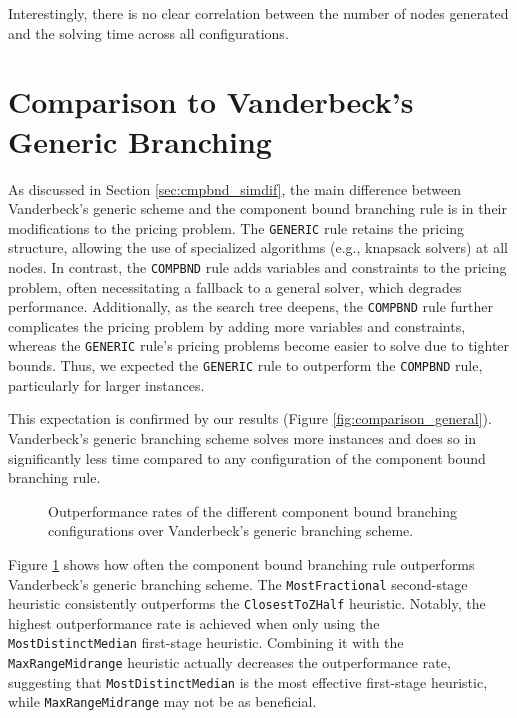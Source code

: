 Interestingly, there is no clear correlation between the number of nodes generated and the solving time across all configurations.

\section{Comparison to Vanderbeck's Generic Branching}\label{sec:evaluation_comparison_generic}
As discussed in Section \ref{sec:cmpbnd_simdif}, the main difference between Vanderbeck's generic scheme and the component bound branching rule is in their modifications to the pricing problem. The \texttt{GENERIC} rule retains the pricing structure, allowing the use of specialized algorithms (e.g., knapsack solvers) at all nodes. In contrast, the \texttt{COMPBND} rule adds variables and constraints to the pricing problem, often necessitating a fallback to a general \MIP{} solver, which degrades performance. Additionally, as the search tree deepens, the \texttt{COMPBND} rule further complicates the pricing problem by adding more variables and constraints, whereas the \texttt{GENERIC} rule’s pricing problems become easier to solve due to tighter bounds. Thus, we expected the \texttt{GENERIC} rule to outperform the \texttt{COMPBND} rule, particularly for larger instances.

This expectation is confirmed by our results (Figure \ref{fig:comparison_general}). Vanderbeck's generic branching scheme solves more instances and does so in significantly less time compared to any configuration of the component bound branching rule.

\begin{figure}
	\centering

	\begin{subfigure}{0.495\textwidth}
		\centering
		
	\end{subfigure}
	\hfill
	\begin{subfigure}{0.495\textwidth}
		\centering
		
	\end{subfigure}

	\caption{Outperformance rates of the different component bound branching configurations over Vanderbeck's generic branching scheme.}
	\label{fig:comparison_outperform}
\end{figure}

Figure \ref{fig:comparison_outperform} shows how often the component bound branching rule outperforms Vanderbeck's generic branching scheme. The \texttt{MostFractional} second-stage heuristic consistently outperforms the \texttt{ClosestToZHalf} heuristic. Notably, the highest outperformance rate is achieved when only using the \texttt{MostDistinctMedian} first-stage heuristic. Combining it with the \texttt{MaxRangeMidrange} heuristic actually decreases the outperformance rate, suggesting that \texttt{MostDistinctMedian} is the most effective first-stage heuristic, while \texttt{MaxRangeMidrange} may not be as beneficial.

